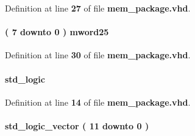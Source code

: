 Definition at line {\bf 27} of file {\bf mem\+\_\+package.\+vhd}.

\paragraph[{marray8x25}]{ {\bfseries \textcolor{vhdlchar}{(}\textcolor{vhdlchar}{ }\textcolor{vhdlchar}{ } \textcolor{vhdldigit}{7} \textcolor{vhdlchar}{ }\textcolor{keywordflow}{downto}\textcolor{vhdlchar}{ }\textcolor{vhdlchar}{ } \textcolor{vhdldigit}{0} \textcolor{vhdlchar}{ }\textcolor{vhdlchar}{)}\textcolor{vhdlchar}{ }\textcolor{vhdlchar}{ }{\bfseries {\bf mword25}} \textcolor{vhdlchar}{ }} \hspace{0.3cm}{\ttfamily [Type]}}\label{classmem__package_a87640d064db2e70f2a86b662a57e8b5e}


Definition at line {\bf 30} of file {\bf mem\+\_\+package.\+vhd}.

\paragraph[{mword1}]{ {\bfseries \textcolor{comment}{std\+\_\+logic}\textcolor{vhdlchar}{ }} \hspace{0.3cm}{\ttfamily [Subtype]}}\label{classmem__package_acdc033ba4c703327665b5e153ba88fe9}


Definition at line {\bf 14} of file {\bf mem\+\_\+package.\+vhd}.

\paragraph[{mword12}]{ {\bfseries \textcolor{comment}{std\+\_\+logic\+\_\+vector}\textcolor{vhdlchar}{ }\textcolor{vhdlchar}{(}\textcolor{vhdlchar}{ }\textcolor{vhdlchar}{ } \textcolor{vhdldigit}{11} \textcolor{vhdlchar}{ }\textcolor{keywordflow}{downto}\textcolor{vhdlchar}{ }\textcolor{vhdlchar}{ } \textcolor{vhdldigit}{0} \textcolor{vhdlchar}{ }\textcolor{vhdlchar}{)}\textcolor{vhdlchar}{ }} \hspace{0.3cm}{\ttfamily [Subtype]}}\label{classmem__package_a5020f16db3d1c4be7fa72da923a51d44}


